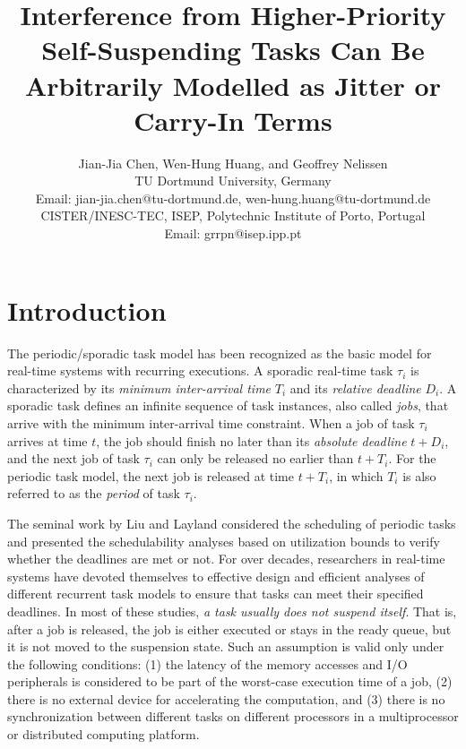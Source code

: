 \documentclass[10pt,conference,preprint]{IEEEtran}
\begin{document}
\title{\LARGE Interference from Higher-Priority Self-Suspending Tasks Can Be
  Arbitrarily Modelled as Jitter or Carry-In Terms}

\author{Jian-Jia Chen, Wen-Hung Huang, and Geoffrey Nelissen\\
TU Dortmund University, Germany\\
Email: jian-jia.chen@tu-dortmund.de, wen-hung.huang@tu-dortmund.de\\
CISTER/INESC-TEC, ISEP, Polytechnic Institute of Porto, Portugal \\
Email: grrpn@isep.ipp.pt
}

\maketitle

\begin{abstract}
  
\end{abstract}

\section{Introduction}

The periodic/sporadic task model has been recognized as the basic
model for real-time systems with recurring executions.  A sporadic
real-time task $\tau_i$ is characterized by its \emph{minimum
  inter-arrival time} $T_i$ and its
\emph{relative deadline} $D_i$. A sporadic task defines an infinite
sequence of task instances, also called \emph{jobs}, that arrive with
the minimum inter-arrival time constraint. When a job of task $\tau_i$
arrives at time $t$, the job should finish no later than its
\emph{absolute deadline} $t+D_i$, and the next job of task $\tau_i$
can only be released no earlier than $t+T_i$. For the periodic task
model, the next job is released at time $t+T_i$, in which $T_i$ is
also referred to as the \emph{period} of task $\tau_i$.


The seminal work by Liu and Layland \cite{Liu_1973} considered the
scheduling of periodic tasks and presented the schedulability analyses
based on utilization bounds to verify whether the deadlines are met or
not.  For over decades, researchers in real-time systems have
devoted themselves to effective design and efficient analyses of
different recurrent task models to ensure that tasks can meet their
specified deadlines. In most of these studies, \emph{a task usually does not
 suspend itself}. That is, after a job is released, the job
is either executed or stays in the ready queue, but it is not moved to
the suspension state.  Such an assumption is valid only under the
following conditions: (1) the latency of the memory accesses and I/O
peripherals is considered to be part of the worst-case execution time
of a job, (2) there is no external device for accelerating the
computation, and (3) there is no synchronization between different
tasks on different processors in a multiprocessor or distributed
computing platform.
\end{document}
